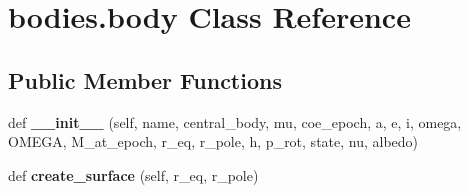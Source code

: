 \hypertarget{classbodies_1_1body}{}\section{bodies.\+body Class Reference}
\label{classbodies_1_1body}
\subsection*{Public Member Functions}
\begin{DoxyCompactItemize}
\item 
\mbox{\label{classbodies_1_1body_aeeaa9e8a9be7ee2bdcc6e59e2ca08cf9}} 
def {\bfseries \+\_\+\+\_\+init\+\_\+\+\_\+} (self, name, central\+\_\+body, mu, coe\+\_\+epoch, a, e, i, omega, O\+M\+E\+GA, M\+\_\+at\+\_\+epoch, r\+\_\+eq, r\+\_\+pole, h, p\+\_\+rot, state, nu, albedo)
\item 
\mbox{\label{classbodies_1_1body_a7749604fdd74bdc6dac7f83fb60af220}} 
def {\bfseries create\+\_\+surface} (self, r\+\_\+eq, r\+\_\+pole)
\end{DoxyCompactItemize}
